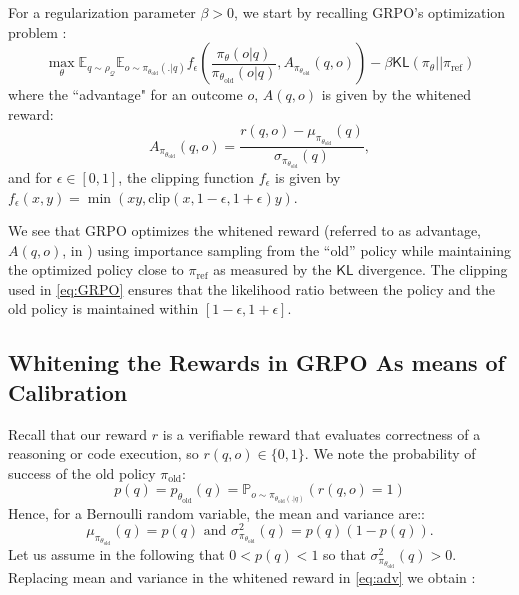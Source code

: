 \documentclass[11pt,reqno]{amsart}
\begin{document}
\noindent For a regularization parameter $\beta>0$, we  start by recalling  GRPO's optimization problem \citep{shao2024deepseekmath}: 
\begin{equation}
\max_{\theta} \mathbb{E}_{q\sim \rho_{\mathcal{Q}}} \mathbb{E}_{o\sim \pi_{\theta_{\text{old}}} (. |q) } f_{\epsilon}\left( \frac{\pi_{\theta} (o| q )}{\pi_{\theta_{\text{old}}}(o| q) }, A_{\pi_{\theta_{\text{old}}}}(q,o)  \right) - \beta \mathsf{KL} (\pi_{\theta} || \pi_{\mathrm{ref}}) 
\label{eq:GRPO}
\tag{GRPO-Clip}
\end{equation}
where the ``advantage" for an outcome $o$, $A(q,o)$ is given by the whitened reward:
\begin{equation}
A_{\pi_{\theta_{\text{old}}}}(q,o) = \frac{  r (q,o)-  \mu_{\pi_{\theta_{\text{old}}}}(q)  }{ \sigma_{\pi_{\theta_{\text{old}}}}(q)},
\label{eq:adv}
\end{equation}
and for $\epsilon \in [0,1]$, the clipping function
$f_{\epsilon}$  is given by  $ f_{\epsilon}(x,y)= \min(x y, \text{clip}(x,1-\epsilon, 1+ \epsilon) y ).$


\noindent We see that GRPO optimizes the whitened reward (referred to as advantage, $A(q,o)$, in \citep{shao2024deepseekmath}) using importance sampling from the ``old'' policy while maintaining the optimized policy close to  $\pi_{\mathrm{ref}}$ as measured by the $\mathsf{KL}$ divergence. The clipping used in \eqref{eq:GRPO} ensures that the likelihood ratio between the policy and the old policy is maintained within  $[1-\epsilon,1+ \epsilon]$.


\subsection{Whitening the Rewards in GRPO As means of  Calibration }

Recall that our reward $r$ is a verifiable reward that evaluates correctness of a reasoning or code  execution, so $r(q,o) \in \{0,1\}$. 
We note the probability of success of the old  policy $\pi_{\text{old}}$:
\begin{equation}
p(q) =  p_{\theta_{\text{old}}} (q) = \mathbb{P}_{o \sim \pi_{\theta_{\text{old}}(.|q) }}  ( r(q,o)=1 ) 
\end{equation}
Hence, for a Bernoulli random variable, the mean and variance are::
\[ \mu_{\pi_{\theta_{\text{old}}}}(q)   = p(q) \text{ and } \sigma^2_{\pi_{\theta_{\text{old}}}}(q) = p(q)(1-p(q)) .\]
Let us assume in the following that \underline{ $0<p(q)<1$} so that $\sigma^2_{\pi_{\theta_{\text{old}}}}(q)>0$.   Replacing mean and variance in  the whitened reward  in \eqref{eq:adv} we obtain :
\end{document}
